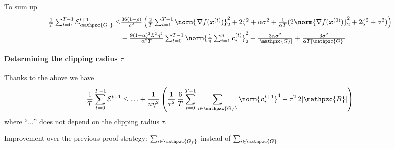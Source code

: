 \documentclass{article}
\newcommand{\gset}{\ensuremath{{\mathpzc{G}}}}
\newcommand{\bset}{\ensuremath{{\mathpzc{B}}}}
\newcommand{\gcset}{\ensuremath{{\mathpzc{G_c}}}}
\newcommand{\gfset}{\ensuremath{{\mathpzc{G_f}}}}
\begin{document}
To sum up
\begin{align*}
  \tfrac{1}{T} \tsum_{t=0}^{T-1} \cE_\gcset^{t+1}
  \le
   & \tfrac{36(1-\rho)}{\rho^2}
  \left(
  \tfrac{2}{T}\tsum_{t=1}^{T-1} \norm{\nabla f(\xx^{(t)}) }_2^2
  +  2  \zeta^2
  + \alpha\sigma^2
  + \tfrac{1}{\alpha T}(2\norm{\nabla f(\xx^{(0)}) }_2^2
    + 2 \zeta^2
    + \sigma^2)
  \right)
  \\
   & + \tfrac{9(1-\alpha)^2 L^2\eta^2}{\alpha^2T} \tsum_{t=0}^{T-1}
  \norm{ \tfrac{1}{n} \tsum_{i=1}^n \cc_i^{(t)} }_2^2
  + \tfrac{3\alpha\sigma^2}{|\gset|} + \tfrac{3\sigma^2}{\alpha T|\gset|}
\end{align*}


\paragraph*{Determining the clipping radius $\tau$}


Thanks to the above we have
\begin{align*}
  \frac{1}{T} \sum_{t=0}^{T-1} \mathcal E^{t+1}
  \le
  \ldots + \frac{1}{n \eta^2}
  \left(
  \frac{1}{\tau^2} \, \frac{6}{T} \sum_{t=0}^{T-1} \sum_{i \in \gfset} \norm{\vv_i^{t+1}}^4 + \tau^2 \, 2 |\bset|
  \right)
\end{align*}
where ``$\ldots$'' does not depend on the clipping radius $\tau$.

Improvement over the previous proof strategy: $\sum_{i\in\gfset}$ instead of $\sum_{i\in\gset}$
\end{document}
